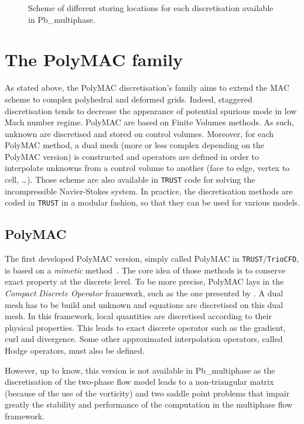 \begin{figure}[htbp]
\begin{subfigure}[b]{0.45\textwidth}
    \label{PolyVEF}
  \end{subfigure}
  \caption{Scheme of different storing locations for each discretisation available in Pb\_multiphase.}
  \label{Spatialdiscretisation}
\end{figure}

\section{The PolyMAC family\label{sec:polymac-family}}
As stated above, the PolyMAC discretisation's family aims to extend the MAC scheme to complex polyhedral and deformed grids. Indeed, staggered discretisation tends to decrease the appearance of potential spurious mode in low Mach number regime. PolyMAC are based on Finite Volumes methods. As such, unknown are discretised and stored on control volumes. Moreover, for each PolyMAC method, a dual mesh (more or less complex depending on the PolyMAC version) is constructed and operators are defined in order to interpolate unknowns from a control volume to another (face to edge, vertex to cell, \ldots). Those scheme are also available in \texttt{TRUST} code for solving the incompressible Navier-Stokes system. In practice, the discretisation methods are coded in \texttt{TRUST} in a modular fashion, so that they can be used for various models. 

\subsection{PolyMAC}
The first developed PolyMAC version, simply called PolyMAC in \texttt{TRUST}/\texttt{TrioCFD}, is based on a \textit{mimetic} method~\cite{lipnikov2014mimetic}. The core idea of those methods is to conserve exact property at the discrete level. To be more precise, PolyMAC lays in the \textit{Compact Discrete Operator} framework, such as the one presented by \cite{bonelle2014,milani2020}. A dual mesh has to be build and unknown and equations are discretised on this dual mesh. In this framework, local quantities are discretised according to their physical properties. This leads to exact discrete operator such as the gradient, curl and divergence. Some other approximated interpolation operators, called Hodge operators, must also be defined.

However, up to know, this version is not available in Pb\_multiphase as the discretisation of the two-phase flow model leads to a non-triangular matrix (because of the use of the vorticity) and two saddle point problems that impair greatly the stability and performance of the computation in the multiphase flow framework. 

